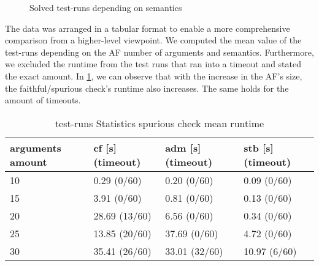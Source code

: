 \begin{figure}[H]
    \centering
    \caption{Solved test-runs depending on semantics}
    \label{fig:expfaithful/Semantics/OnePlot}
\end{figure}


The data was arranged in a tabular format to enable a more comprehensive comparison from a higher-level viewpoint. We computed the mean value of the test-runs depending on the AF number of arguments and semantics. Furthermore, we excluded the runtime from the test runs that ran into a timeout and stated the exact amount. In \cref{table:ExperimentStatisticsFaithfulCheck}, we can observe that with the increase in the AF's size, the faithful/spurious check's runtime also increases. The same holds for the amount of timeouts.


\begin{table}[htb]
    \centering
    \caption{test-runs Statistics spurious check mean runtime}
    \begin{tabular}{ |l|l|l|l| }
        \hline
            arguments amount & cf [s] (timeout)& adm [s] (timeout)& stb [s] (timeout)\\
        \hline
            10 &   0.29 \hfill(0/60)  &   0.20 \hfill (0/60)  &   0.09 \hfill (0/60) \\
            15 &   3.91 \hfill(0/60)  &   0.81 \hfill (0/60)  &   0.13 \hfill (0/60) \\
            20 &  28.69 \hfill(13/60) &   6.56 \hfill (0/60)  &   0.34 \hfill (0/60) \\
            25 &  13.85 \hfill(20/60) &  37.69 \hfill (0/60)  &   4.72 \hfill (0/60) \\
            30 &  35.41 \hfill(26/60) &  33.01 \hfill (32/60) &  10.97 \hfill (6/60) \\
        \hline
    \end{tabular}
\label{table:ExperimentStatisticsFaithfulCheck}
\end{table}


